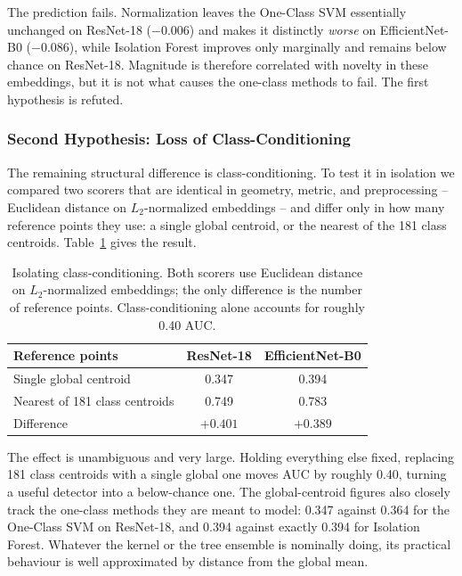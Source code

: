 \documentclass[11pt]{article}
\begin{document}
The prediction fails. Normalization leaves the One-Class SVM essentially unchanged on ResNet-18 ($-0.006$) and makes it distinctly \emph{worse} on EfficientNet-B0 ($-0.086$), while Isolation Forest improves only marginally and remains below chance on ResNet-18. Magnitude is therefore correlated with novelty in these embeddings, but it is not what causes the one-class methods to fail. The first hypothesis is refuted.

\subsubsection{Second Hypothesis: Loss of Class-Conditioning}

The remaining structural difference is class-conditioning. To test it in isolation we compared two scorers that are identical in geometry, metric, and preprocessing -- Euclidean distance on $L_2$-normalized embeddings -- and differ only in how many reference points they use: a single global centroid, or the nearest of the 181 class centroids. Table~\ref{tab:centroid} gives the result.

\begin{table}[H]
\centering
\caption{Isolating class-conditioning. Both scorers use Euclidean distance on $L_2$-normalized embeddings; the only difference is the number of reference points. Class-conditioning alone accounts for roughly 0.40 AUC.}
\label{tab:centroid}

\begin{tabular}{lcc}
\toprule
Reference points & ResNet-18 & EfficientNet-B0 \\
\midrule
Single global centroid          & 0.347 & 0.394 \\
Nearest of 181 class centroids  & 0.749 & 0.783 \\
\midrule
Difference                      & $+0.401$ & $+0.389$ \\
\bottomrule
\end{tabular}
\end{table}

The effect is unambiguous and very large. Holding everything else fixed, replacing 181 class centroids with a single global one moves AUC by roughly 0.40, turning a useful detector into a below-chance one. The global-centroid figures also closely track the one-class methods they are meant to model: 0.347 against 0.364 for the One-Class SVM on ResNet-18, and 0.394 against exactly 0.394 for Isolation Forest. Whatever the kernel or the tree ensemble is nominally doing, its practical behaviour is well approximated by distance from the global mean.
\end{document}
